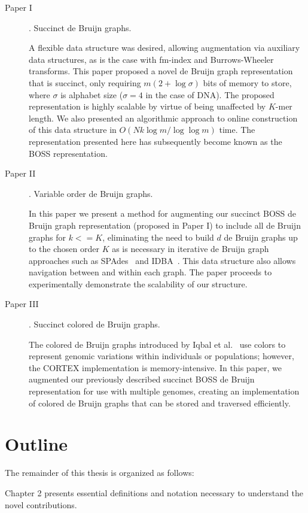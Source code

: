 \begin{description}
\item [Paper I]. Succinct de Bruijn graphs.

A flexible data structure was desired, allowing augmentation via auxiliary data structures, as is the case
with fm-index and Burrows-Wheeler transforms. This paper proposed a novel de Bruijn graph representation that is succinct, only requiring $m(2+\log{\sigma})$ bits of memory to store, where $\sigma$ is alphabet size ($\sigma=4$ in the case of DNA). The proposed representation is highly scalable by virtue of being unaffected by $K$-mer length. We also presented an algorithmic approach to online construction of this data structure in $O(Nk\log{m}/\log{\log{m}})$ time. The representation presented here has subsequently become known as the BOSS representation.
\item [Paper II]. Variable order de Bruijn graphs.

In this paper we present a method for augmenting our succinct BOSS de Bruijn graph representation (proposed in Paper I) to include all de Bruijn graphs for $k<=K$, eliminating the need to build $d$ de Bruijn graphs up to the chosen order $K$ as is necessary in iterative de Bruijn graph approaches such as SPAdes~\cite{bankevich2012spades} and IDBA~\cite{peng2010idba}. This data structure also allows navigation between and within each graph. The paper proceeds to experimentally demonstrate the scalability of our structure.
\item [Paper III]. Succinct colored de Bruijn graphs.

The colored de Bruijn graphs introduced by Iqbal et al.~\cite{ICTFM12} %
use colors to represent genomic variations within individuals or populations; however, the CORTEX implementation is memory-intensive. In this paper, we augmented our previously described succinct BOSS de Bruijn representation for use with multiple genomes, creating an implementation of colored de Bruijn graphs that can be stored and traversed efficiently.
\end{description}

\section{Outline}

The remainder of this thesis is organized as follows:

Chapter 2 presents essential definitions and notation necessary to understand the novel contributions. 

